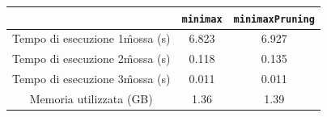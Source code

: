 \documentclass[11pt, a4paper]{article}
\begin{document}
\begin{center}
	\begin{tabular}{|c|c|c|}
		\hline
		& \texttt{minimax} & \texttt{minimaxPruning}\\
		\hline
		Tempo di esecuzione 1\^ mossa (s) & 6.823 & 6.927\\
		Tempo di esecuzione 2\^ mossa (s) & 0.118 & 0.135\\
		Tempo di esecuzione 3\^ mossa (s) & 0.011 & 0.011\\
		Memoria utilizzata (GB) & 1.36 & 1.39\\
		\hline
	\end{tabular}
\end{center} 
	
\end{document}

